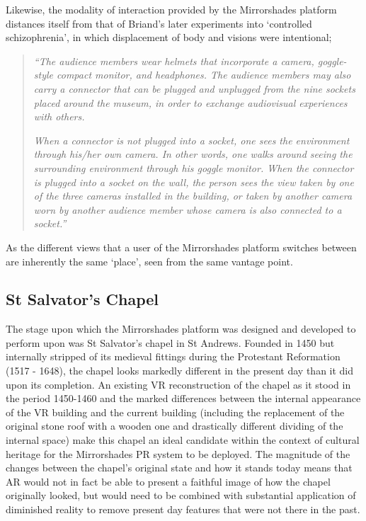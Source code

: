 Likewise, the modality of interaction provided by the Mirrorshades platform distances itself from that of Briand's later experiments into `controlled schizophrenia', in which displacement of body and visions were intentional;

\begin{quote}
	\textit{``The audience members wear helmets that incorporate a camera, goggle-style compact monitor, and headphones. The audience members may also carry a connector that can be plugged and unplugged from the nine sockets placed around the museum, in order to exchange audiovisual experiences with others.}

	\textit{When a connector is not plugged into a socket, one sees the environment through his/her own camera. In other words, one walks around seeing the surrounding environment through his goggle monitor. When the connector is plugged into a socket on the wall, the person sees the view taken by one of the three cameras installed in the building, or taken by another camera worn by another audience member whose camera is also connected to a socket.''}~\cite{Jones2006}
\end{quote}

As the different views that a user of the Mirrorshades platform switches between are inherently the same `place', seen from the same vantage point.


\subsection{St Salvator's Chapel}

The stage upon which the Mirrorshades platform was designed and developed to perform upon was St Salvator's chapel in St Andrews. Founded in 1450 but internally stripped of its medieval fittings during the Protestant Reformation (1517 - 1648), the chapel looks markedly different in the present day than it did upon its completion. An existing VR reconstruction of the chapel as it stood in the period 1450-1460 and the marked differences between the internal appearance of the VR building and the current building (including the replacement of the original stone roof with a wooden one and drastically different dividing of the internal space) make this chapel an ideal candidate within the context of cultural heritage for the Mirrorshades PR system to be deployed. The magnitude of the changes between the chapel's original state and how it stands today means that AR would not in fact be able to present a faithful image of how the chapel originally looked, but would need to be combined with substantial application of diminished reality to remove present day features that were not there in the past.

